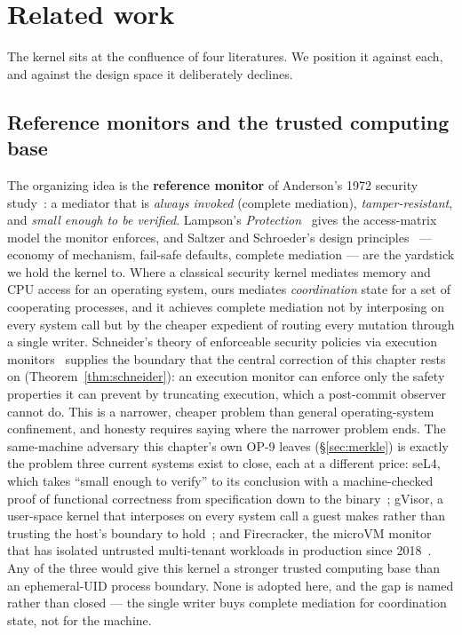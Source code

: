\documentclass[11pt,a4paper]{article}
\theoremstyle{definition}
\theoremstyle{remark}
\begin{document}
\section{Related work}
\label{sec:related}

The kernel sits at the confluence of four literatures. We position it against each,
and against the design space it deliberately declines.

\subsection{Reference monitors and the trusted computing base}

The organizing idea is the \textbf{reference monitor} of Anderson's 1972 security
study~: a mediator that is \emph{always invoked} (complete
mediation), \emph{tamper-resistant}, and \emph{small enough to be verified}.
Lampson's \emph{Protection}~ gives the access-matrix model the
monitor enforces, and Saltzer and Schroeder's design
principles~ --- economy of mechanism, fail-safe
defaults, complete mediation --- are the yardstick we hold the kernel to. Where a
classical security kernel mediates memory and CPU access for an operating system,
ours mediates \emph{coordination} state for a set of cooperating processes, and it
achieves complete mediation not by interposing on every system call but by the
cheaper expedient of routing every mutation through a single writer. Schneider's
theory of enforceable security policies via execution monitors~
supplies the boundary that the central correction of this chapter rests on
(Theorem~\ref{thm:schneider}): an execution monitor can enforce only the safety
properties it can prevent by truncating execution, which a post-commit observer
cannot do. This is a narrower, cheaper problem than general operating-system
confinement, and honesty requires saying where the narrower problem ends. The
same-machine adversary this chapter's own OP-9 leaves \Open{}
(\S\ref{sec:merkle}) is exactly the problem three current systems exist to
close, each at a different price: seL4, which takes ``small enough to verify''
to its conclusion with a machine-checked proof of functional correctness from
specification down to the binary~; gVisor, a user-space
kernel that interposes on every system call a guest makes rather than trusting
the host's boundary to hold~; and Firecracker, the
microVM monitor that has isolated untrusted multi-tenant workloads in
production since 2018~. Any of the three would
give this kernel a stronger trusted computing base than an ephemeral-UID
process boundary. None is adopted here, and the gap is named rather than closed
--- the single writer buys complete mediation for coordination state, not for
the machine.
\end{document}
